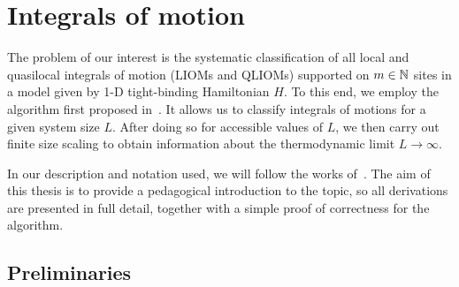 \chapter{Integrals of motion}
\thispagestyle{chapterBeginStyle}

The problem of our interest is the systematic classification of all local and quasilocal integrals of
motion (LIOMs and QLIOMs) supported on \( m \in \mathbb{N} \) sites in a model given by 1-D tight-binding Hamiltonian \(H\). 
To this end, we employ the algorithm first proposed in~\textcite{Mierzejewski2015a}. It allows us to classify integrals
of motions for a given system size \(L\). After doing so for accessible values of \(L\), we then carry out finite size scaling
to obtain information about the thermodynamic limit \(L \to \infty \). 

In our description and notation used, we will  follow
the works of~\textcite{Mierzejewski2015a,Mierzejewski2015Approx,Mierzejewski2018}.
The aim of this thesis is to provide a pedagogical introduction to the topic,
so all derivations are presented in full detail, together with a simple proof of correctness for the algorithm.

\section{Preliminaries}

